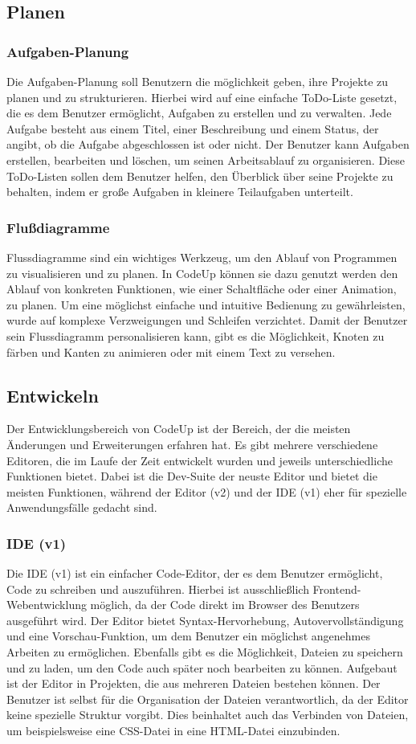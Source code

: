 \documentclass[main.tex]{subfiles}
\begin{document}
    \subsection{Planen}
    \subsubsection{Aufgaben-Planung}
    Die Aufgaben-Planung soll Benutzern die möglichkeit geben, ihre Projekte zu planen und zu strukturieren.
    Hierbei wird auf eine einfache ToDo-Liste gesetzt, die es dem Benutzer ermöglicht, Aufgaben zu erstellen und zu verwalten.
    Jede Aufgabe besteht aus einem Titel, einer Beschreibung und einem Status, der angibt, ob die Aufgabe abgeschlossen ist oder nicht.
    Der Benutzer kann Aufgaben erstellen, bearbeiten und löschen, um seinen Arbeitsablauf zu organisieren.
    Diese ToDo-Listen sollen dem Benutzer helfen, den Überblick über seine Projekte zu behalten, indem er große Aufgaben in kleinere Teilaufgaben unterteilt.
    \subsubsection{Flußdiagramme}
    Flussdiagramme sind ein wichtiges Werkzeug, um den Ablauf von Programmen zu visualisieren und zu planen.
    In CodeUp können sie dazu genutzt werden den Ablauf von konkreten Funktionen, wie einer Schaltfläche oder einer Animation, zu planen.
    Um eine möglichst einfache und intuitive Bedienung zu gewährleisten, wurde auf komplexe Verzweigungen und Schleifen verzichtet.
    Damit der Benutzer sein Flussdiagramm personalisieren kann, gibt es die Möglichkeit, Knoten zu färben und Kanten zu animieren oder mit einem Text zu versehen.
    \subsection{Entwickeln}
    Der Entwicklungsbereich von CodeUp ist der Bereich, der die meisten Änderungen und Erweiterungen erfahren hat.
    Es gibt mehrere verschiedene Editoren, die im Laufe der Zeit entwickelt wurden und jeweils unterschiedliche Funktionen bietet.
    Dabei ist die Dev-Suite der neuste Editor und bietet die meisten Funktionen, während der Editor (v2) und der IDE (v1) eher für spezielle Anwendungsfälle gedacht sind.
    \subsubsection{IDE (v1)}
    Die IDE (v1) ist ein einfacher Code-Editor, der es dem Benutzer ermöglicht, Code zu schreiben und auszuführen.
    Hierbei ist ausschließlich Frontend-Webentwicklung möglich, da der Code direkt im Browser des Benutzers ausgeführt wird.
    Der Editor bietet Syntax-Hervorhebung, Autovervollständigung und eine Vorschau-Funktion, um dem Benutzer ein möglichst angenehmes Arbeiten zu ermöglichen.
    Ebenfalls gibt es die Möglichkeit, Dateien zu speichern und zu laden, um den Code auch später noch bearbeiten zu können.
    Aufgebaut ist der Editor in Projekten, die aus mehreren Dateien bestehen können.
    Der Benutzer ist selbst für die Organisation der Dateien verantwortlich, da der Editor keine spezielle Struktur vorgibt.
    Dies beinhaltet auch das Verbinden von Dateien, um beispielsweise eine CSS-Datei in eine HTML-Datei einzubinden.
\end{document}
